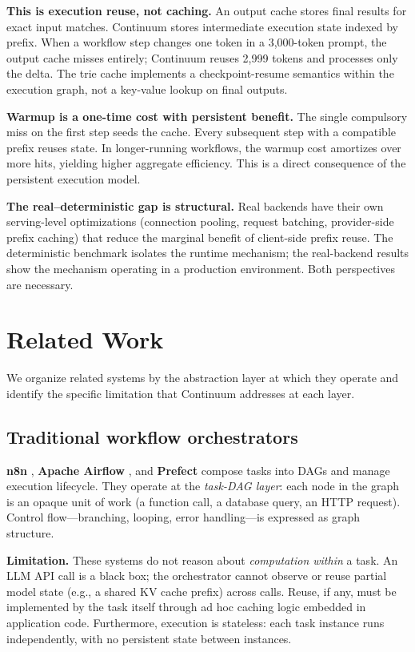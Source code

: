 \documentclass[10pt,twocolumn]{article}
\begin{document}
\textbf{This is execution reuse, not caching.} An output cache stores final results for exact input matches. Continuum stores intermediate execution state indexed by prefix. When a workflow step changes one token in a 3,000-token prompt, the output cache misses entirely; Continuum reuses 2,999 tokens and processes only the delta. The trie cache implements a checkpoint-resume semantics within the execution graph, not a key-value lookup on final outputs.

\textbf{Warmup is a one-time cost with persistent benefit.} The single compulsory miss on the first step seeds the cache. Every subsequent step with a compatible prefix reuses state. In longer-running workflows, the warmup cost amortizes over more hits, yielding higher aggregate efficiency. This is a direct consequence of the persistent execution model.

\textbf{The real--deterministic gap is structural.} Real backends have their own serving-level optimizations (connection pooling, request batching, provider-side prefix caching) that reduce the marginal benefit of client-side prefix reuse. The deterministic benchmark isolates the runtime mechanism; the real-backend results show the mechanism operating in a production environment. Both perspectives are necessary.

\section{Related Work}

We organize related systems by the abstraction layer at which they operate and identify the specific limitation that Continuum addresses at each layer.

\subsection{Traditional workflow orchestrators}

\textbf{n8n} \cite{n8n2024docs}, \textbf{Apache Airflow} \cite{apache2024airflow}, and \textbf{Prefect} \cite{prefect2024docs} compose tasks into DAGs and manage execution lifecycle. They operate at the \emph{task-DAG layer}: each node in the graph is an opaque unit of work (a function call, a database query, an HTTP request). Control flow---branching, looping, error handling---is expressed as graph structure.

\textbf{Limitation.} These systems do not reason about \emph{computation within} a task. An LLM API call is a black box; the orchestrator cannot observe or reuse partial model state (e.g., a shared KV cache prefix) across calls. Reuse, if any, must be implemented by the task itself through ad hoc caching logic embedded in application code. Furthermore, execution is stateless: each task instance runs independently, with no persistent state between instances.
\end{document}
